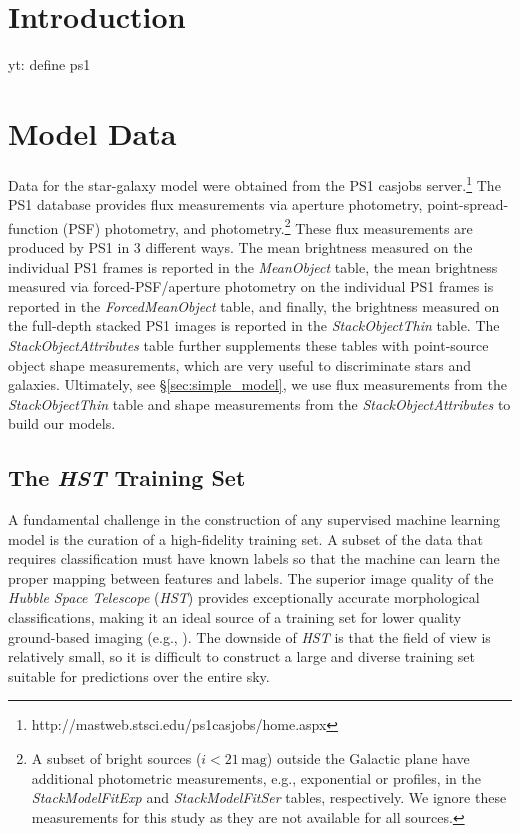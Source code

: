 \documentclass[twocolumn]{aastex62}
\newcommand{\yutaro}[1]{{\color{red} yt: {#1}}}
\begin{document}

\section{Introduction}
\label{sec:intro}

\yutaro{define ps1}

\section{Model Data}

Data for the star-galaxy model were obtained from the PS1 casjobs server.\footnote{http://mastweb.stsci.edu/ps1casjobs/home.aspx} The PS1 database provides flux measurements via aperture photometry, point-spread-function (PSF) photometry, and \citet{Kron80} photometry.\footnote{A subset of bright sources ($i < 21\,\mathrm{mag}$) outside the Galactic plane have additional photometric measurements, e.g., exponential or \citet{Sersic63} profiles, in the \textit{StackModelFitExp} and \textit{StackModelFitSer} tables, respectively. We ignore these measurements for this study as they are not available for all sources.} These flux measurements are produced by PS1 in 3 different ways. The mean brightness measured on the individual PS1 frames is reported in the \textit{MeanObject} table, the mean brightness measured via forced-PSF/aperture photometry on the individual PS1 frames is reported in the \textit{ForcedMeanObject} table, and finally, the brightness measured on the full-depth stacked PS1 images is reported in the \textit{StackObjectThin} table. The \textit{StackObjectAttributes} table further supplements these tables with point-source object shape measurements, which are very useful to discriminate stars and galaxies. Ultimately, see \S\ref{sec:simple_model}, we use flux measurements from the \textit{StackObjectThin} table and shape measurements from the \textit{StackObjectAttributes} to build our models.

\subsection{The \textit{HST} Training Set} 

A fundamental challenge in the construction of any supervised machine learning model is the curation of a high-fidelity training set. A subset of the data that requires classification must have known labels so that the machine can learn the proper mapping between features and labels. The superior image quality of the \textit{Hubble Space Telescope} (\textit{HST}) provides exceptionally accurate morphological classifications, making it an ideal source of a training set for lower quality ground-based imaging (e.g., \citealt{Lupton01}). The downside of \textit{HST} is that the field of view is relatively small, so it is difficult to construct a large and diverse training set suitable for predictions over the entire sky. 
\end{document}
